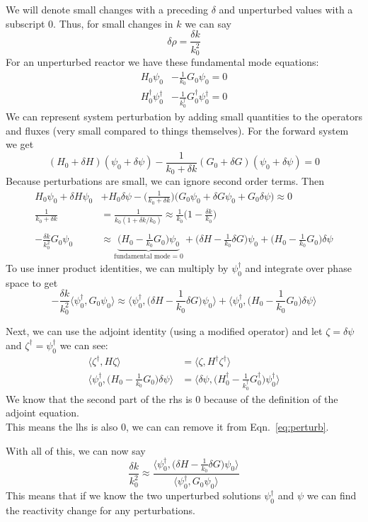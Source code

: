 \documentclass[12pt]{article}
\begin{document}
We will denote small changes with a preceding $\delta$ and unperturbed values with a subscript $0$. Thus, for small changes in $k$ we can say 
\[
\delta \rho = \frac{\delta k}{k_0^2}
\]
For an unperturbed reactor we have these fundamental mode equations:
\begin{align*}
H_0\psi_0 &- \frac{1}{k_0}G_0\psi_0 = 0\\
H_0^{\dagger}\psi_0^{\dagger} &- \frac{1}{k_0^{\dagger}}G_0^{\dagger}\psi_0^{\dagger} = 0
\end{align*}
We can represent system perturbation by adding small quantities to the operators and fluxes (very small compared to things themselves). For the forward system we get
\[
(H_0 + \delta H)(\psi_0 + \delta \psi) - \frac{1}{k_0 + \delta k}(G_0 + \delta G)(\psi_0 + \delta \psi) = 0
\]
Because perturbations are small, we can ignore second order terms. Then
\begin{align*}
H_0 \psi_0 + \delta H \psi_0 &+ H_0\delta\psi - \bigl(\frac{1}{k_0 + \delta k}\bigr)\bigl(G_0\psi_0 + \delta G \psi_0 + G_0\delta\psi \bigr) \approx 0 \\
%
\frac{1}{k_0 + \delta k} &= \frac{1}{k_0(1 + \delta k/k_0)} \approx \frac{1}{k_0}\bigl(1 - \frac{\delta k}{k_0}\bigr) \\
\\
%
-\frac{\delta k}{k_0^2}G_0\psi_0 &\approx \underbrace{\bigl(H_0 - \frac{1}{k_0}G_0 \bigr)\psi_0}_{\text{fundamental mode}=0} + \bigl(\delta H - \frac{1}{k_0}\delta G\bigr)\psi_0  + \bigl(H_0 - \frac{1}{k_0}G_0 \bigr)\delta \psi
\end{align*}
To use inner product identities, we can multiply by $\psi_0^{\dagger}$ and integrate over phase space to get
\begin{equation}
-\frac{\delta k}{k_0^2} \langle \psi_0^{\dagger}, G_0\psi_0 \rangle \approx \langle \psi_0^{\dagger},\bigl(\delta H - \frac{1}{k_0}\delta G\bigr)\psi_0 \rangle + \langle \psi_0^{\dagger},\bigl(H_0 - \frac{1}{k_0}G_0 \bigr)\delta \psi \rangle
\label{eq:perturb}
\end{equation}

Next, we can use the adjoint identity (using a modified operator) and let $\zeta = \delta\psi$ and $\zeta^{\dagger} = \psi_0^{\dagger}$ we can see:
\begin{align*}
\langle\zeta^{\dagger}, H \zeta\rangle &= \langle\zeta, H^{\dagger} \zeta^{\dagger}\rangle \\
%
\langle \psi_0^{\dagger}, \bigl(H_0 - \frac{1}{k_0}G_0 \bigr)\delta \psi \rangle &= \langle \delta \psi,  \bigl(H_0^{\dagger} - \frac{1}{k_0^{\dagger}}G_0^{\dagger} \bigr)\psi_0^{\dagger} \rangle
\end{align*}
We know that the second part of the rhs is 0 because of the definition of the adjoint equation.\\
This means the lhs is also 0, we can can remove it from Eqn.~\ref{eq:perturb}.

With all of this, we can now say
\[
\frac{\delta k}{k_0^2} \approx \frac{\langle \psi_0^{\dagger},\bigl(\delta H - \frac{1}{k_0}\delta G\bigr)\psi_0 \rangle}{\langle \psi_0^{\dagger}, G_0\psi_0 \rangle}
\]
This means that if we know the two unperturbed solutions $\psi_0^{\dagger}$ and $\psi$ we can find the reactivity change for any perturbations.
\end{document}
